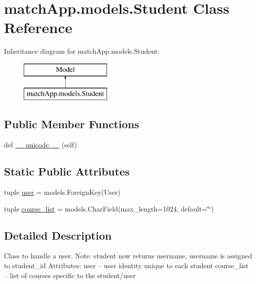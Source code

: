 \hypertarget{classmatch_app_1_1models_1_1_student}{}\section{match\+App.\+models.\+Student Class Reference}
\label{classmatch_app_1_1models_1_1_student}
Inheritance diagram for match\+App.\+models.\+Student\+:\begin{figure}[H]
\begin{center}
\leavevmode
\includegraphics[height=2.000000cm]{classmatch_app_1_1models_1_1_student}
\end{center}
\end{figure}
\subsection*{Public Member Functions}
\begin{DoxyCompactItemize}
\item 
def \hyperlink{classmatch_app_1_1models_1_1_student_a943c2dcc1a40a150c9df5b5741d763a0}{\+\_\+\+\_\+unicode\+\_\+\+\_\+} (self)
\end{DoxyCompactItemize}
\subsection*{Static Public Attributes}
\begin{DoxyCompactItemize}
\item 
tuple \hyperlink{classmatch_app_1_1models_1_1_student_ab99adbde45247ad55b887f0e6360ff9f}{user} = models.\+Foreign\+Key(User)
\item 
tuple \hyperlink{classmatch_app_1_1models_1_1_student_a5df96ebd643f4251fbcd50c2d81a36c0}{course\+\_\+list} = models.\+Char\+Field(max\+\_\+length=1024, default=\char`\"{}\char`\"{})
\end{DoxyCompactItemize}


\subsection{Detailed Description}
\begin{DoxyVerb}Class to handle a user. 
Note: student now returns username, username is assigned to student_id 
Attributes: 
user -- user identity unique to each student
course_list -- list of courses specific to the student/user
\end{DoxyVerb}
 

